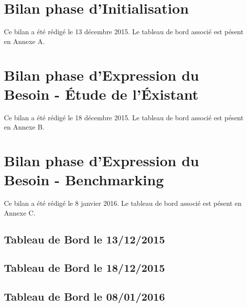 

\newcommand{\mainTitle}{\'Etude préalable - SPIE}
\newcommand{\secondTitle}{Document de suivi}
\newcommand{\documentRef}{TB/4401/1}




\newpage

\tableofcontents
\listoffigures
\listoftables
\newpage


\part{Bilan phase d'Initialisation}

Ce bilan a été rédigé le 13 décembre 2015. Le tableau de bord associé est pésent en Annexe A.

\setcounter{section}{0}


\part{Bilan phase d'Expression du Besoin - \'Etude de l'\'Existant}

Ce bilan a été rédigé le 18 décembre 2015. Le tableau de bord associé est pésent en Annexe B.

\setcounter{section}{0}


\part{Bilan phase d'Expression du Besoin - Benchmarking}

Ce bilan a été rédigé le 8 janvier 2016. Le tableau de bord associé est pésent en Annexe C.

\setcounter{section}{0}



\begin{appendices}

\chapter{Tableau de Bord le 13/12/2015}


\chapter{Tableau de Bord le 18/12/2015}


\chapter{Tableau de Bord le 08/01/2016}
%

\end{appendices}



